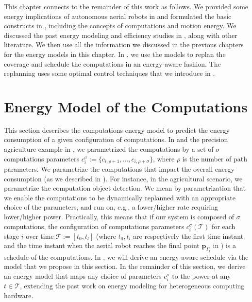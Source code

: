 This chapter connects to the remainder of this work as follows. We provided some energy implications of autonomous aerial robots in  and formulated the basic constructs in , including the concepts of computations and motion energy. We discussed the past energy modeling and efficiency studies in , along with other literature. We then use all the information we discussed in the previous chapters for the energy models in this chapter. In , we use the models to replan the coverage and schedule the computations in an energy-aware fashion. The replanning uses some optimal control techniques that we introduce in .


\section{Energy Model of the Computations}
\label{sec:comp-ener-model}

This section describes the computations energy model to predict the energy consumption of a given configuration of computations. In  and the precision agriculture example in , we parametrized the computations by a set of $\sigma$ computations parameters $c_{i}^\sigma:=\{c_{i,\rho+1},\dots,c_{i,\rho+\sigma}\}$, where $\rho$ is the number of path parameters. We parametrize the computations that impact the overall energy consumption (as we described in ). For instance, in the agricultural scenario, we parametrize the computation object detection. We mean by parametrization that we enable the computations to be dynamically replanned with an appropriate choice of the parameters, and run on, e.g., a lower/higher rate requiring lower/higher power. Practically, this means that if our system is composed of $\sigma$ computations, the configuration of computations parameters $c_i^\sigma(\mathcal{T})$ for each stage $i$ over time $\mathcal{T}:=[t_0,t_l]$ (where $t_0,t_l$ are respectively the first time instant and the time instant when the aerial robot reaches the final point $\mathbf{p}_{\Gamma_l}$ in ) is a schedule of the computations. In , we will derive an energy-aware schedule via the model that we propose in this section.
In the remainder of this section, we derive an energy model that maps any choice of parameters $c_{i}^{\sigma}$ to the power at any $t\in\mathcal{T}$, extending the past work on energy modeling for heterogeneous computing hardware.

